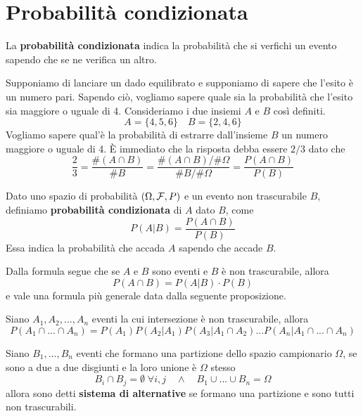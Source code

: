 \section{Probabilità condizionata}
La \textbf{probabilità condizionata} indica la probabilità che si verfichi un evento sapendo che
se ne verifica un altro.

\begin{example}
	Supponiamo di lanciare un dado equilibrato e supponiamo di sapere che l'esito è un numero
	pari. Sapendo ciò, vogliamo sapere quale sia la probabilità che l'esito sia maggiore o uguale
	di 4. Consideriamo i due insiemi $A$ e $B$ così definiti.
	\[ A = \{ 4, 5, 6 \} \quad B = \{ 2, 4, 6 \} \]
	Vogliamo sapere qual'è la probabilità di estrarre dall'insieme $B$ un numero maggiore o uguale
	di 4. \`E immediato che la risposta debba essere $2/3$ dato che
	\[
		\frac{2}{3} = \frac{\# (A \cap B)}{\# B} =
		\frac{\# (A \cap B) / \# \Omega}{\# B / \# \Omega} =
		\frac{P(A \cap B)}{P(B)}
	\]
\end{example}

\begin{definition}
	Dato uno spazio di probabilità $(\Omega, \mathcal{F}, P)$ e un evento non trascurabile $B$, definiamo
	\textbf{probabilità condizionata} di $A$ dato $B$, come
	\[ P(A | B) = \frac{P(A \cap B)}{P(B)} \]
	Essa indica la probabilità che accada $A$ sapendo che accade $B$.
\end{definition}

Dalla formula segue che se $A$ e $B$ sono eventi e $B$ è non trascurabile, allora
\[ P(A \cap B) = P(A | B) \cdot P(B) \]
e vale una formula più generale data dalla seguente proposizione.

\begin{proposition}
	Siano $A_1, A_2, ..., A_n$ eventi la cui intersezione è non trascurabile, allora
	\[
		P(A_1 \cap  ... \cap A_n) = P(A_1) P(A_2 | A_1) P(A_3 | A_1 \cap A_2)
		... P(A_n | A_1 \cap ... \cap A_n)
	\]
\end{proposition}

\begin{definition}
	Siano $B_1, ..., B_n$ eventi che formano una partizione dello spazio campionario $\Omega$, se
	sono a due a due disgiunti e la loro unione è $\Omega$ stesso
	\[ B_i \cap B_j = \emptyset \; \forall i,j \quad \land \quad B_1 \cup ... \cup B_n = \Omega \]
	allora sono detti \textbf{sistema di alternative} se formano una partizione e sono tutti non
	trascurabili.
\end{definition}

